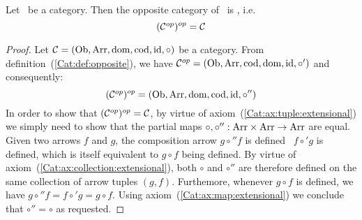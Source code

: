 \begin{prop}
    Let \Cat\ be a category. Then the opposite category of \Cop\ is \Cat, i.e.
        \[
            (\mbox{${\cal C}^{op}$})^{op} = \mbox{$\cal C$}
        \]
\end{prop}
\begin{proof}
    Let $\mbox{$\cal C$}=(\mbox{\rm Ob}, \mbox{\rm Arr}, \mbox{\rm dom},\mbox{\rm cod}, \mbox{\rm id}, \circ)$ be a category. From
    definition~(\ref{Cat:def:opposite}), we have
    $\mbox{${\cal C}^{op}$}=(\mbox{\rm Ob}, \mbox{\rm Arr}, \mbox{\rm cod}, \mbox{\rm dom}, \mbox{\rm id}, \circ')$ and consequently:
        \[
            (\mbox{${\cal C}^{op}$})^{op}=(\mbox{\rm Ob}, \mbox{\rm Arr}, \mbox{\rm dom}, \mbox{\rm cod}, \mbox{\rm id}, \circ'')
        \]
    In order to show that $(\mbox{${\cal C}^{op}$})^{op}=\mbox{$\cal C$}$, by virtue of 
    axiom~(\ref{Cat:ax:tuple:extensional}) we simply need to show that
    the partial maps $\circ,\circ'':\mbox{\rm Arr}\times\mbox{\rm Arr}\to\mbox{\rm Arr}$ are equal.
    Given two arrows $f$ and $g$, the composition arrow $g\circ'' f$ is 
    defined \ifand\ $f\circ' g$ is defined, which is itself equivalent to 
    $g\circ f$ being defined. By virtue of
    axiom~(\ref{Cat:ax:collection:extensional}), both $\circ$ and $\circ''$ 
    are therefore defined on the same collection of arrow tuples $(g,f)$.
    Furthemore, whenever $g\circ f$ is defined, we have 
    $g\circ'' f=f\circ' g=g\circ f$. Using axiom~(\ref{Cat:ax:map:extensional})
    we conclude that $\circ''=\circ$ as requested.
\end{proof}

